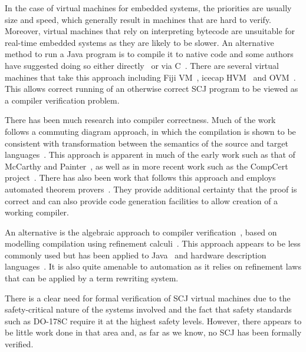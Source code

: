In the case of virtual machines for embedded systems, the priorities
are usually size and speed, which generally result in machines that
are hard to verify.
Moreover, virtual machines that rely on interpreting bytecode are
unsuitable for real-time embedded systems as they are likely to be
slower.
An alternative method to run a Java program is to compile it to native
code and some authors have suggested doing so either
directly~\cite{schultz2003} or via C~\cite{varma2004}.
There are several virtual machines that take this approach including
Fiji VM~\cite{pizlo2009}, icecap HVM~\cite{sondergaard2012} and
OVM~\cite{armbruster2007}.
This allows correct running of an otherwise correct SCJ program to be
viewed as a compiler verification problem.

There has been much research into compiler correctness.
Much of the work follows a commuting diagram approach, in which the
compilation is shown to be consistent with transformation between the
semantics of the source and target languages~\cite{morris1973,
  thatcher1979}.
This approach is apparent in much of the early work such as that of
McCarthy and Painter~\cite{mccarthy1967}, as well as in more recent
work such as the CompCert project~\cite{leroy2009a, leroy2009b}.
There has also been work that follows this approach and employs
automated theorem provers~\cite{klein2006, milner1972, nipkow2000}.
They provide additional certainty that the proof is correct and can
also provide code generation facilities to allow creation of a working
compiler.

An alternative is the algebraic approach to compiler
verification~\cite{hoare1991, sampaio1993}, based on modelling
compilation using refinement calculi~\cite{back1981, morgan1990,
  morris1987}.
This approach appears to be less commonly used but has been applied to
Java~\cite{duran2005, duran2010} and hardware description
languages~\cite{perna2010, perna2011}.
It is also quite amenable to automation as it relies on refinement
laws that can be applied by a term rewriting system.

There is a clear need for formal verification of SCJ virtual
machines due to the safety-critical nature of the
systems involved and the fact that safety standards such as DO-178C
require it at the highest safety levels.
However, there appears to be little work done in that area and, as far
as we know, no SCJ has been formally verified.


